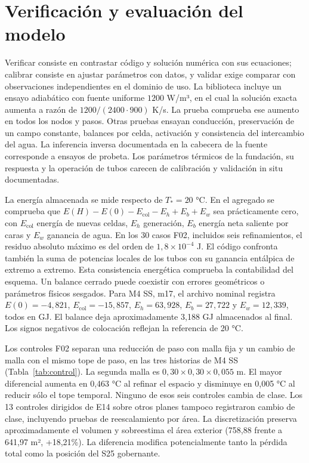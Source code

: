 \documentclass[11pt,a4paper]{article}
\begin{document}
\section{Verificación y evaluación del modelo}
Verificar consiste en contrastar código y solución numérica con sus ecuaciones; calibrar consiste en ajustar parámetros con datos, y validar exige comparar con observaciones independientes en el dominio de uso. La biblioteca incluye un ensayo adiabático con fuente uniforme $1200$ W/m³, en el cual la solución exacta aumenta a razón de $1200/(2400\cdot 900)$ K/s. La prueba comprueba ese aumento en todos los nodos y pasos. Otras pruebas ensayan conducción, preservación de un campo constante, balances por celda, activación y consistencia del intercambio del agua. La inferencia inversa documentada en la cabecera de la fuente corresponde a ensayos de probeta. Los parámetros térmicos de la fundación, su respuesta y la operación de tubos carecen de calibración y validación in situ documentadas.

La energía almacenada se mide respecto de $T_*=20$ °C. En el agregado se comprueba que $E(H)-E(0)-E_{\mathrm{col}}-E_h+E_{b}+E_w$ sea prácticamente cero, con $E_{\mathrm{col}}$ energía de nuevas celdas, $E_h$ generación, $E_b$ energía neta saliente por caras y $E_w$ ganancia de agua. En los 30 casos F02, incluidos seis refinamientos, el residuo absoluto máximo es del orden de $1{,}8\times10^{-4}$ J. El código confronta también la suma de potencias locales de los tubos con su ganancia entálpica de extremo a extremo. Esta consistencia energética comprueba la contabilidad del esquema. Un balance cerrado puede coexistir con errores geométricos o parámetros físicos sesgados. Para M4 SS, m17, el archivo nominal registra $E(0)=-4{,}821$, $E_{\mathrm{col}}=-15{,}857$, $E_h=63{,}928$, $E_b=27{,}722$ y $E_w=12{,}339$, todos en GJ. El balance deja aproximadamente 3,188 GJ almacenados al final. Los signos negativos de colocación reflejan la referencia de 20 °C.

Los controles F02 separan una reducción de paso con malla fija y un cambio de malla con el mismo tope de paso, en las tres historias de M4 SS (Tabla~\ref{tab:control}). La segunda malla es $0{,}30\times0{,}30\times0{,}055$ m. El mayor diferencial aumenta en 0,463 °C al refinar el espacio y disminuye en 0,005 °C al reducir sólo el tope temporal. Ninguno de esos seis controles cambia de clase. Los 13 controles dirigidos de E14 sobre otros planes tampoco registraron cambio de clase, incluyendo pruebas de reescalamiento por área. La discretización preserva aproximadamente el volumen y sobreestima el área exterior (758,88 frente a 641,97 m², +18,21\%). La diferencia modifica potencialmente tanto la pérdida total como la posición del S25 gobernante.
\end{document}

